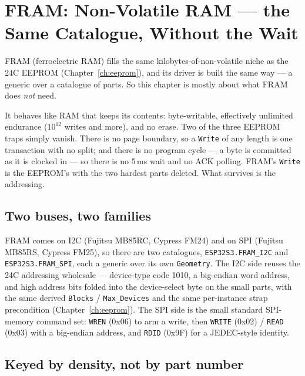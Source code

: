 \chapter[FRAM: Non-Volatile RAM]%
        {FRAM: Non-Volatile RAM --- the Same Catalogue, Without the Wait}
\label{ch:fram}

FRAM (ferroelectric RAM) fills the same kilobytes-of-non-volatile niche as the 24C
EEPROM (Chapter~\ref{ch:eeprom}), and its driver is built the same way --- a
generic over a catalogue of parts. So this chapter is mostly about what FRAM does
\emph{not} need.

It behaves like RAM that keeps its contents: byte-writable, effectively unlimited
endurance ($10^{12}$ writes and more), and no erase. Two of the three EEPROM traps
simply vanish. There is no page boundary, so a \texttt{Write} of any length is one
transaction with no split; and there is no program cycle --- a byte is committed
as it is clocked in --- so there is no 5\,ms wait and no ACK polling. FRAM's
\texttt{Write} is the EEPROM's with the two hardest parts deleted. What survives is
the addressing.

\section{Two buses, two families}

FRAM comes on I2C (Fujitsu MB85RC, Cypress FM24) and on SPI (Fujitsu MB85RS,
Cypress FM25), so there are two catalogues, \texttt{ESP32S3.FRAM\_I2C} and
\texttt{ESP32S3.FRAM\_SPI}, each a generic over its own \texttt{Geometry}. The I2C
side reuses the 24C addressing wholesale --- device-type code 1010, a big-endian
word address, and high address bits folded into the device-select byte on the
small parts, with the same derived \texttt{Blocks} / \texttt{Max\_Devices} and the
same per-instance strap precondition (Chapter~\ref{ch:eeprom}). The SPI side is the
small standard SPI-memory command set: \texttt{WREN} (0x06) to arm a write, then
\texttt{WRITE} (0x02) / \texttt{READ} (0x03) with a big-endian address, and
\texttt{RDID} (0x9F) for a JEDEC-style identity.

\section{Keyed by density, not by part number}

